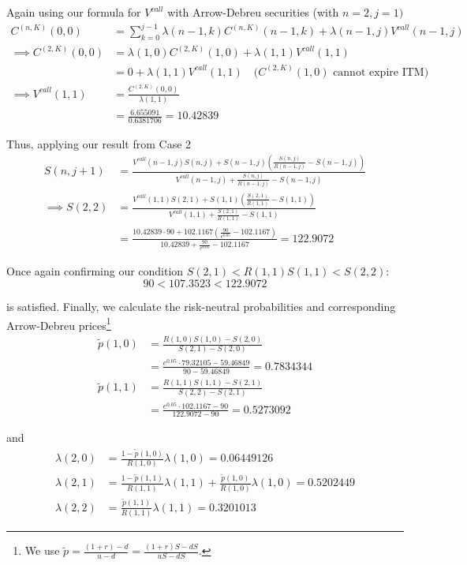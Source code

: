 \documentclass[12pt]{article}
\begin{document}
Again using our formula for $V^{call}$ with Arrow-Debreu securities (with $n = 2, j = 1)$
\begin{align*}
	C^{(n,K)}(0,0) &= \sum^{j - 1}_{k = 0} \lambda(n - 1, k)C^{(n, K)}(n - 1, k) + \lambda(n - 1, j)V^{call}(n - 1, j) \\
	\implies C^{(2,K)}(0,0) &= \lambda(1, 0)C^{(2, K)}(1, 0) + \lambda(1, 1)V^{call}(1,1) \\
	&= 0 + \lambda(1, 1)V^{call}(1,1) \quad \text{($C^{(2,K)}(1,0)$ cannot expire ITM)} \\
	\implies V^{call}(1,1) &= \frac{ C^{(2, K)}(0,0) }{ \lambda(1, 1)} \\
	&= \frac{ 6.655091 }{ 0.6381706 } = 10.42839
\end{align*}

Thus, applying our result from Case 2
\begin{align*}
	S(n, j + 1) &= \frac{ V^{call}(n - 1, j) S(n, j) + S(n - 1,j) \left( \frac{ S(n, j) }{ R(n - 1, j) } - S(n - 1,j) \right) }{ V^{call}(n - 1, j) + \frac{ S(n, j) }{ R(n - 1, j) } - S(n - 1,j) } \\
	\implies S(2,2) &= \frac{ V^{call}(1,1)S(2,1) + S(1,1) \left( \frac{ S(2,1) }{ R(1,1) } - S(1,1) \right) }{ V^{call}(1,1) + \frac{ S(2,1) }{ R(1,1) } - S(1,1) } \\
	&= \frac{ 10.42839 \cdot 90 + 102.1167 \left( \frac{90}{e^0.05} - 102.1167 \right) }{ 10.42839 + \frac{90}{e^0.05} - 102.1167 } = 122.9072
\end{align*}

Once again confirming our condition $S(2,1) < R(1,1)S(1,1) < S(2,2)$:
\begin{equation*}
	90 < 107.3523 < 122.9072
\end{equation*}

is satisfied. Finally, we calculate the risk-neutral probabilities and corresponding Arrow-Debreu prices\footnote{ We use $\tilde{p} = \frac{ (1 + r) - d}{u - d} = \frac{ (1 + r)S - dS }{ uS - dS }$.}
\begin{align*}
	\tilde{p}(1,0) &= \frac{ R(1,0)S(1,0) - S(2,0) }{ S(2,1) - S(2,0) } \\
	&= \frac{ e^0.05 \cdot 79.32105 - 59.46849 }{ 90 - 59.46849 } = 0.7834344 \\
	\tilde{p}(1,1) &= \frac{ R(1,1)S(1,1) - S(2,1) }{ S(2,2) - S(2,1) } \\
	&= \frac{ e^0.05 \cdot 102.1167 - 90 }{ 122.9072 - 90 } = 0.5273092
\end{align*}

and
\begin{align*}
	\lambda(2,0) &= \frac{ 1 - \tilde{p}(1,0) }{ R(1,0) } \lambda(1,0) = 0.06449126 \\
	\lambda(2,1) &= \frac{ 1 - \tilde{p}(1,1) }{ R(1,1) } \lambda(1,1) + \frac{ \tilde{p}(1,0) }{ R(1,0) } \lambda(1,0) = 0.5202449 \\
	\lambda(2,2) &= \frac{ \tilde{p}(1,1) }{ R(1,1) } \lambda(1,1) = 0.3201013
\end{align*}
\end{document}
